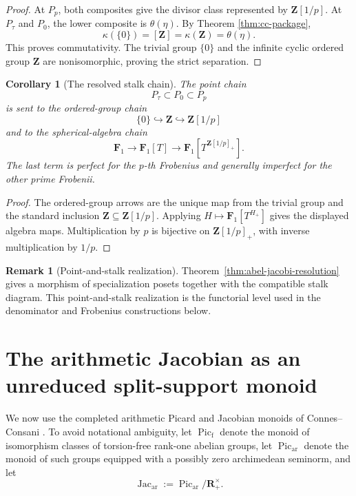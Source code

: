 \documentclass[11pt]{amsart}
\numberwithin{equation}{section}
\newtheorem{corollary}[theorem]{Corollary}
\theoremstyle{definition}
\newtheorem{remark}[theorem]{Remark}
\newcommand{\Z}{\mathbf Z}
\newcommand{\R}{\mathbf R}
\newcommand{\Fone}{\mathbf F_1}
\newcommand{\Picf}{\operatorname{Pic}_{\mathrm f}}
\newcommand{\Picar}{\operatorname{Pic}_{\mathrm{ar}}}
\newcommand{\Jacar}{\operatorname{Jac}_{\mathrm{ar}}}
\begin{document}
\begin{proof}
At $P_p$, both composites give the divisor class represented by
$\Z[1/p]$.  At $P_\tau$ and $P_0$, the lower composite is $\theta(\eta)$.
By Theorem \ref{thm:cc-package},
\[
\kappa(\{0\})=[\Z]=\kappa(\Z)=\theta(\eta).
\]
This proves commutativity.  The trivial group $\{0\}$ and the infinite
cyclic ordered group $\Z$ are nonisomorphic, proving the strict
separation.
\end{proof}

\begin{corollary}[The resolved stalk chain]
\label{cor:resolved-stalk-chain}
The point chain
\[
P_\tau\subset P_0\subset P_p
\]
is sent to the ordered-group chain
\[
\{0\}\hookrightarrow\Z\hookrightarrow\Z[1/p]
\]
and to the spherical-algebra chain
\[
\Fone
\longrightarrow
\Fone[T]
\longrightarrow
\Fone[T^{\Z[1/p]_+}].
\]
The last term is perfect for the $p$-th Frobenius and generally imperfect
for the other prime Frobenii.
\end{corollary}

\begin{proof}
The ordered-group arrows are the unique map from the trivial group and the
standard inclusion $\Z\subseteq\Z[1/p]$.  Applying
$H\mapsto\Fone[T^{H_+}]$ gives the displayed algebra maps.  Multiplication
by $p$ is bijective on $\Z[1/p]_+$, with inverse multiplication by $1/p$.
\end{proof}

\begin{remark}[Point-and-stalk realization]
Theorem~\ref{thm:abel-jacobi-resolution} gives a morphism of specialization
posets together with the compatible stalk diagram.  This point-and-stalk
realization is the functorial level used in the denominator and Frobenius
constructions below.
\end{remark}


\section{The arithmetic Jacobian as an unreduced split-support monoid}
\label{sec:arithmetic-jacobian-split}

We now use the completed arithmetic Picard and Jacobian monoids of
Connes--Consani \cite{CCJacobian}.  To avoid notational ambiguity, let
$\Picf$ denote the monoid of isomorphism classes of torsion-free rank-one
abelian groups, let $\Picar$ denote the monoid of such groups equipped with
a possibly zero archimedean seminorm, and let
\[
\Jacar:=\Picar/\R_+^\times.
\]
\end{document}
